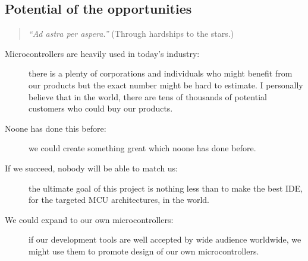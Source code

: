 \documentclass[a4paper,twoside,15pt]{book}
\begin{document}
		\subsection{Potential of the opportunities}
			\begin{quote}
				\textit{``Ad astra per aspera.''} \small{(Through hardships to the stars.)}
			\end{quote}
			 \begin{description}
					\item[Microcontrollers are heavily used in today's industry:]
						there is a plenty of corporations and individuals who might benefit from our products but the exact number might be hard to estimate. I personally believe that in the world, there are tens of thousands of potential customers who could buy our products.
					\item[Noone has done this before:]
						we could create something great which noone has done before.
					\item[If we succeed, nobody will be able to match us:]
						the ultimate goal of this project is nothing less than to make the best IDE, for the targeted MCU architectures, in the world.
					\item[We could expand to our own microcontrollers:]
						if our development tools are well accepted by wide audience worldwide, we might use them to promote design of our own microcontrollers.
			\end{description}
\end{document}
